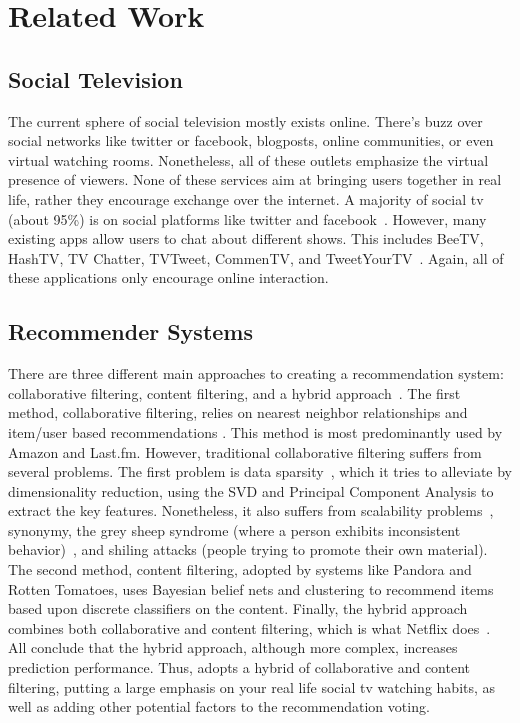 \section{Related Work}

\subsection{Social Television}
The current sphere of social television mostly exists online.  There's
buzz over social networks like twitter or facebook, blogposts, online
communities, or even virtual watching rooms.  Nonetheless, all of
these outlets emphasize the virtual presence of viewers.  None of
these services aim at bringing users together in real life, rather
they encourage exchange over the internet.  A majority of social tv
(about 95\%) is on social platforms like twitter and
facebook~\cite{chausse}.  However, many existing apps allow users to
chat about different shows.  This includes BeeTV, HashTV, TV Chatter,
TVTweet, CommenTV, and TweetYourTV~\cite{chausse}.  Again, all of
these applications only encourage online interaction.

\subsection{Recommender Systems} 
\label{sec:recommender}
There are three different main approaches to creating a recommendation
system: collaborative filtering, content filtering, and a hybrid
approach~\cite{su,vozalis}.  The first method, collaborative
filtering, relies on nearest neighbor relationships and item/user
based recommendations \cite{su}.  This method is most predominantly
used by Amazon and Last.fm.  However, traditional collaborative
filtering suffers from several problems.  The first problem is data
sparsity~\cite{su,melville}, which it tries to alleviate by
dimensionality reduction, using the SVD and Principal Component
Analysis to extract the key features.  Nonetheless, it also suffers
from scalability problems~\cite{papagelis}, synonymy, the grey sheep
syndrome (where a person exhibits inconsistent behavior)~\cite{su},
and shiling attacks (people trying to promote their own material).
The second method, content filtering, adopted by systems like Pandora
and Rotten Tomatoes, uses Bayesian belief nets and clustering to
recommend items based upon discrete classifiers on the content.
Finally, the hybrid approach combines both collaborative and content
filtering, which is what Netflix does~\cite{su,melville}.  All
conclude that the hybrid approach, although more complex, increases
prediction performance.  Thus, {\sys} adopts a hybrid of collaborative
and content filtering, putting a large emphasis on your real life
social tv watching habits, as well as adding other potential factors
to the recommendation voting.

